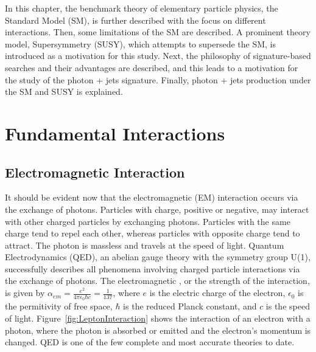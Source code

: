 \vspace{0.015\textheight}
In this chapter, the benchmark theory of elementary particle physics, the Standard Model (SM), is further described with the focus on different interactions. Then, some limitations of the SM are described. A prominent theory model, Supersymmetry (SUSY), which attempts to supersede the SM, is introduced as a motivation for this study. Next, the philosophy of signature-based searches and their advantages are described, and this leads to a motivation for the study of the photon + jets signature. Finally, photon + jets production under the SM and SUSY is explained.

\section{Fundamental Interactions}
\vspace{0.03\textheight}
\subsection{Electromagnetic Interaction}
It should be evident now that the electromagnetic (EM) interaction occurs via the exchange of photons. Particles with charge, positive or negative, may interact with other charged particles by exchanging photons. Particles with the same charge tend to repel each other, whereas particles with opposite charge tend to attract. The photon is massless and travels at the speed of light. Quantum Electrodynamics (QED), an abelian gauge theory with the symmetry group U(1), successfully describes all phenomena involving charged particle interactions via the exchange of photons. The electromagnetic , or the strength of the interaction, is given by $\alpha_{em} = \frac{e^{2}}{4\pi\epsilon_{0}\hbar c} = \frac{1}{137}$, where $e$ is the electric charge of the electron, $\epsilon_{0}$ is the permitivity of free space, $\hbar$ is the reduced Planck constant, and $c$ is the speed of light. Figure~\ref{fig:LeptonInteraction} shows the interaction of an electron with a photon, where the photon is absorbed or emitted and the electron's momentum is changed. QED is one of the few complete and most accurate theories to date.

